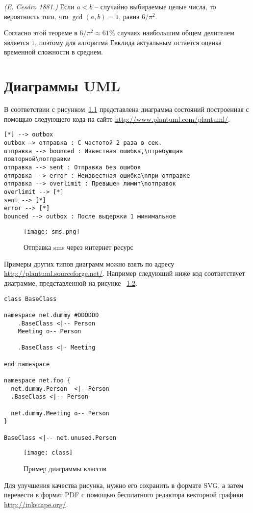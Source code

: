 \documentclass[14pt]{extreport}
\begin{document}
\begin{theorem}\emph{(E. Ces\'aro 1881.)}
Если $a < b$ -- случайно выбираемые целые числа,
то вероятность того, что $\gcd(a, b) = 1$, равна
$6/\pi^2$.
\end{theorem}
Согласно этой теореме в $6/\pi^2 \approx 61\%$ случаях
наибольшим общем делителем является $1$, поэтому
для алгоритма Евклида актуальным остается
оценка временной сложности в среднем.

\chapter{Диаграммы UML}

В соответствии с рисунком~\ref{sms} представлена диаграмма состояний
построенная с помощью следующего кода на сайте
\url{http://www.plantuml.com/plantuml/}.
\begin{Verbatim}[fontsize=\small,frame=leftline]
[*] --> outbox
outbox -> отправка : С частотой 2 раза в сек.
отправка --> bounced : Известная ошибка,\nтребующая повторной\nотправки
отправка --> sent : Отправка без ошибок
отправка --> error : Неизвестная ошибка\nпри отправке
отправка --> overlimit : Превышен лимит\nотправок
overlimit --> [*]  
sent --> [*]
error --> [*]
bounced --> outbox : После выдержки 1 минимальное
\end{Verbatim}

\begin{figure}[H]
\centerline{\texttt{[image: sms.png]}}
\caption{Отправка sms через интернет ресурс}
\label{sms}
\end{figure}

Примеры других типов диаграмм можно взять
по адресу \url{http://plantuml.sourceforge.net/}.
Например следующий ниже код соответствует диаграмме, представленной на рисунке ~\ref{class}.
\begin{Verbatim}[fontsize=\small,frame=leftline]
class BaseClass

namespace net.dummy #DDDDDD
    .BaseClass <|-- Person
    Meeting o-- Person
    
    .BaseClass <|- Meeting

end namespace

namespace net.foo {
  net.dummy.Person  <|- Person
  .BaseClass <|-- Person

  net.dummy.Meeting o-- Person
}

BaseClass <|-- net.unused.Person
\end{Verbatim}

\begin{figure}[H]
\centerline{\texttt{[image: class]}}
\caption{Пример диаграммы классов}
\label{class}
\end{figure}
Для улучшения качества рисунка, нужно его
сохранить в формате SVG, а затем перевести в формат PDF
с помощью бесплатного редактора векторной графики \url{http://inkscape.org/}.
\end{document}
